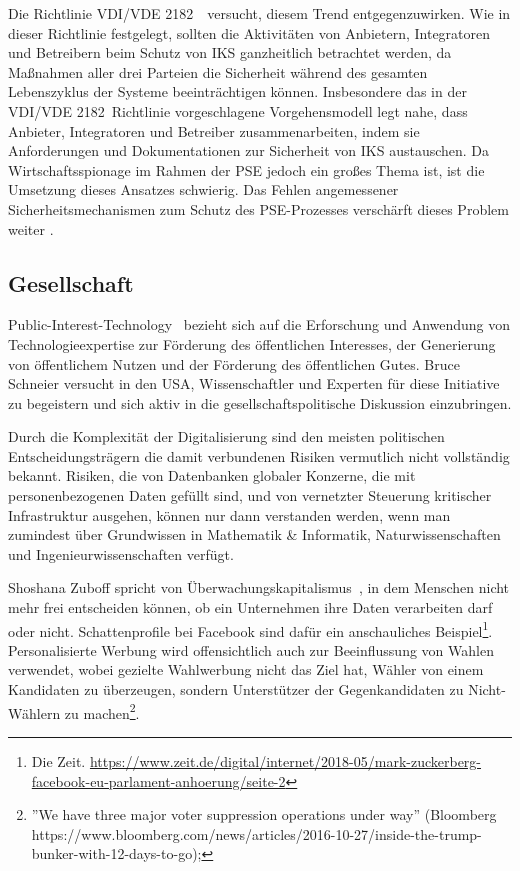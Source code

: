 \documentclass[11pt]{scrartcl}
\newcommand{\vdivde}{VDI/VDE 2182~\cite{VDI/VDE2011}}
\begin{document}
Die Richtlinie \vdivde\ versucht, diesem Trend entgegenzuwirken. Wie in dieser Richtlinie festgelegt, sollten die Aktivitäten von Anbietern, Integratoren und Betreibern beim Schutz von IKS ganzheitlich betrachtet werden, da Maßnahmen aller drei Parteien die Sicherheit während des gesamten Lebenszyklus der Systeme beeinträchtigen können. Insbesondere das in der \vdivde\-Richtlinie vorgeschlagene Vorgehensmodell legt nahe, dass Anbieter, Integratoren und Betreiber zusammenarbeiten, indem sie Anforderungen und Dokumentationen zur Sicherheit von IKS austauschen. Da Wirtschaftsspionage im Rahmen der PSE jedoch ein großes Thema ist, ist die Umsetzung dieses Ansatzes schwierig. Das Fehlen angemessener Sicherheitsmechanismen zum Schutz des PSE-Prozesses verschärft dieses Problem weiter \cite{Weippl2017, Kieseberg2018}.

\subsection{Gesellschaft}

Public-Interest-Technology~\cite{schneier2018click} bezieht sich auf die Erforschung und Anwendung von Technologieexpertise zur Förderung des öffentlichen Interesses, der Generierung von öffentlichem Nutzen und der Förderung des öffentlichen Gutes. Bruce Schneier versucht in den USA,  Wissenschaftler und Experten für diese Initiative zu begeistern und  sich aktiv in die gesellschaftspolitische Diskussion einzubringen.

Durch die Komplexität der Digitalisierung sind den meisten politischen Entscheidungsträgern die damit verbundenen Risiken vermutlich nicht vollständig bekannt. Risiken, die von Datenbanken globaler Konzerne, die mit  personenbezogenen Daten gefüllt sind, und von vernetzter Steuerung kritischer Infrastruktur ausgehen, können nur dann verstanden werden, wenn man zumindest über Grundwissen in Mathematik \& Informatik, Naturwissenschaften und Ingenieurwissenschaften verfügt. 


Shoshana Zuboff spricht von Überwachungskapitalismus~\cite{zuboff2019:surveillanceCapitalism}, in dem Menschen nicht mehr frei entscheiden können, ob ein Unternehmen ihre Daten verarbeiten darf oder nicht. Schattenprofile bei Facebook sind dafür ein anschauliches Beispiel\footnote{Die Zeit. \url{https://www.zeit.de/digital/internet/2018-05/mark-zuckerberg-facebook-eu-parlament-anhoerung/seite-2} }. Personalisierte Werbung wird offensichtlich auch zur Beeinflussung von Wahlen verwendet, wobei gezielte Wahlwerbung nicht das Ziel hat, Wähler von einem Kandidaten zu überzeugen, sondern Unterstützer der Gegenkandidaten zu Nicht-Wählern zu machen\footnote{''We have three major voter suppression operations under way'' (Bloomberg {https://www.bloomberg.com/news/articles/2016-10-27/inside-the-trump-bunker-with-12-days-to-go}); 
}.
\end{document}
